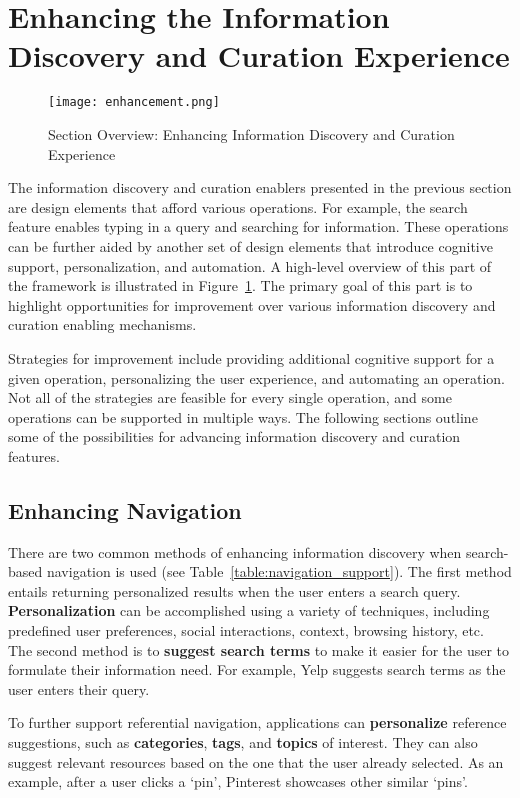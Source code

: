 \clearpage
{\section{Enhancing the Information Discovery and Curation Experience}
\label{section:enhancing}

\begin{figure}[ht!]
	\noindent
	\centering
	\texttt{[image: enhancement.png]}
	\caption{Section Overview: Enhancing Information Discovery and Curation Experience}
	\label{fig:enhancement} 
\end{figure}
The information discovery and curation enablers presented in the previous section are design elements that afford various operations. For example, the search feature enables typing in a query and searching for information. These operations can be further aided by another set of design elements that introduce cognitive support, personalization, and automation. A high-level overview of this part of the framework is illustrated in Figure~\ref{fig:enhancement}. The primary goal of this part is to highlight opportunities for improvement over various information discovery and curation enabling mechanisms.

Strategies for improvement include providing additional cognitive support for a given operation, personalizing the user experience, and automating an operation. Not all of the strategies are feasible for every single operation, and some operations can be supported in multiple ways. The following sections outline some of the possibilities for advancing information discovery and curation features. 

{\subsection{Enhancing Navigation}
There are two common methods of enhancing information discovery when search-based navigation is used (see Table~\ref{table:navigation_support}). The first method entails returning personalized results when the user enters a search query. \textbf{Personalization} can be accomplished using a variety of techniques, including predefined user preferences, social interactions, context, browsing history, etc. The second method is to \textbf{suggest search terms} to make it easier for the user to formulate their information need. For example, Yelp suggests search terms as the user enters their query.

To further support referential navigation, applications can \textbf{personalize} reference suggestions, such as \textbf{categories}, \textbf{tags}, and \textbf{topics} of interest. They can also suggest relevant resources based on the one that the user already selected. As an example, after a user clicks a `pin', Pinterest showcases other similar `pins'.

}}
